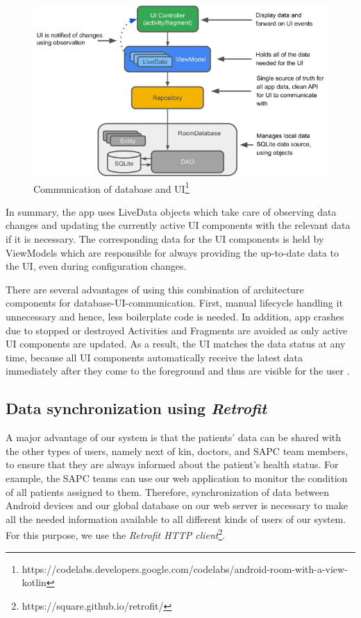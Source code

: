 \begin{figure}[htb]
	\centering
	\includegraphics[width = \textwidth]{figures/room_livedata.png}
	\caption[Communication of database and UI]{Communication of database and UI\footnote{https://codelabs.developers.google.com/codelabs/android-room-with-a-view-kotlin}}
	\label{fig:room_livedata}
\end{figure}

In summary, the app uses LiveData objects which take care of observing data changes and updating the currently active UI components with the relevant data if it is necessary. The corresponding data for the UI components is held by ViewModels which are responsible for always providing the up-to-date data to the UI, even during configuration changes. 

There are several advantages of using this combination of architecture components for database-UI-communication. First, manual lifecycle handling it unnecessary and hence, less boilerplate code is needed. In addition, app crashes due to stopped or destroyed Activities and Fragments are avoided as only active UI components are updated. As a result, the UI matches the data status at any time, because all UI components automatically receive the latest data immediately after they come to the foreground and thus are visible for the user \cite{livedata1, livedata2}. 

\subsection{Data synchronization using \textit{Retrofit}}

A major advantage of our system is that the patients' data can be shared with the other types of users, namely next of kin, doctors, and SAPC team members, to ensure that they are always informed about the patient's health status. For example, the SAPC teams can use our web application to monitor the condition of all patients assigned to them. Therefore, synchronization of data between Android devices and our global database on our web server is necessary to make all the needed information available to all different kinds of users of our system. For this purpose, we use the \textit{Retrofit HTTP client}\footnote{https://square.github.io/retrofit/}.

